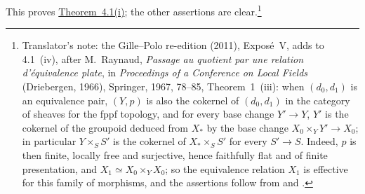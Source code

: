 This proves \hyperref[thm:sga3-V-4.1-i]{Theorem~4.1(i)}; the other assertions are clear.\footnote{Translator's note: the Gille--Polo re-edition (2011), Exposé~V, adds to
4.1~(iv), after M.~Raynaud, \emph{Passage au quotient par une relation
d'équivalence plate}, in \emph{Proceedings of a Conference on Local Fields}
(Driebergen, 1966), Springer, 1967, 78--85, Theorem~1~(iii): when
\((d_0,d_1)\) is an equivalence pair, \((Y,p)\) is also the cokernel of
\((d_0,d_1)\) in the category of sheaves for the fppf topology, and for every
base change \(Y'\to Y\), \(Y'\) is the cokernel of the groupoid deduced from
\(X_\ast\) by the base change \(X_0\times_YY'\to X_0\); in particular
\(Y\times_SS'\) is the cokernel of \(X_\ast\times_SS'\) for every \(S'\to S\).
Indeed, \(p\) is then finite, locally free and surjective, hence faithfully
flat and of finite presentation, and \(X_1\simeq X_0\times_YX_0\); so the
equivalence relation \(X_1\) is effective for this family of morphisms, and
the assertions follow from  and .}

